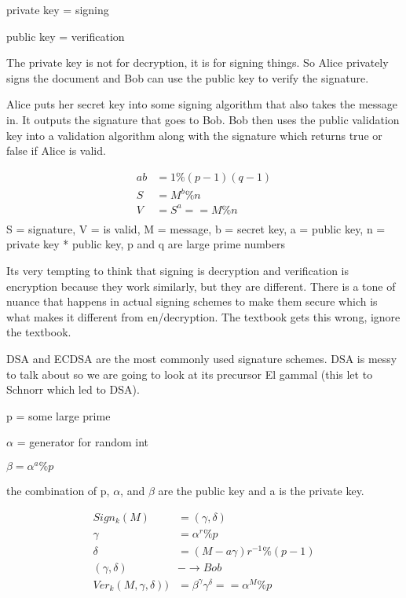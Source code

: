 \documentclass{article}
\begin{document}

private key = signing

public key = verification

The private key is not for decryption, it is for signing things. So Alice privately signs the document and Bob can use the public key to verify the signature.


Alice puts her secret key into some signing algorithm that also takes the message in. It outputs the signature that goes to Bob. Bob then uses the public validation key into a validation algorithm along with the signature which returns true or false if Alice is valid.

\begin{align*}
ab &= 1 \% (p-1)(q-1)\\
S &= M^b \% n\\
V &= S^a == M \% n\\
\end{align*}
S = signature, V = is valid, M = message, b = secret key, a = public key, n = private key * public key, p and q are large prime numbers


Its very tempting to think that signing is decryption and verification is encryption because they work similarly, but they are different. There is a tone of nuance that happens in actual signing schemes to make them secure which is what makes it different from en/decryption. The textbook gets this wrong, ignore the textbook.

DSA and ECDSA are the most commonly used signature schemes. DSA is messy to talk about so we are going to look at its precursor El gammal (this let to Schnorr  which led to DSA).

p = some large prime

$\alpha$ = generator for random int

$\beta = \alpha^a \% p$

the combination of p, $\alpha$, and $\beta$ are the public key and a is the private key.

\begin{align*} 
	Sign_k(M) &= (\gamma, \delta)\\
	\gamma &= \alpha^r \% p\\
	\delta &= (M-a\gamma)r^{-1} \% (p-1)\\
	(\gamma, \delta) &-\rightarrow Bob\\
	Ver_k(M,\gamma, \delta)) &= \beta^\gamma \gamma^\delta == \alpha^M \% p
\end{align*}
\end{document}

